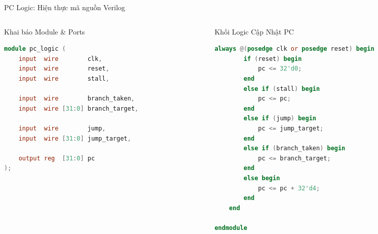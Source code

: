 \begin{frame}[fragile]{PC Logic: Hiện thực mã nguồn Verilog}
    \begin{columns}[t]
        \begin{column}{0.46\textwidth}
            \begin{block}{Khai báo Module \& Ports}
                \begin{lstlisting}[language=Verilog, basicstyle=\fontsize{6.5pt}{8.0pt}\selectfont\ttfamily, keywordstyle=\color{blue}, commentstyle=\color{gray}]
module pc_logic (
    input  wire        clk,
    input  wire        reset,
    input  wire        stall,

    input  wire        branch_taken,
    input  wire [31:0] branch_target,

    input  wire        jump,
    input  wire [31:0] jump_target,

    output reg  [31:0] pc
);
                \end{lstlisting}
            \end{block}
        \end{column}
        
        \begin{column}{0.50\textwidth}
            \begin{block}{Khối Logic Cập Nhật PC}
                \begin{lstlisting}[language=Verilog, basicstyle=\fontsize{6.5pt}{8.0pt}\selectfont\ttfamily, keywordstyle=\color{blue}, commentstyle=\color{gray}]
    always @(posedge clk or posedge reset) begin
        if (reset) begin
            pc <= 32'd0;
        end
        else if (stall) begin
            pc <= pc;
        end
        else if (jump) begin
            pc <= jump_target;
        end
        else if (branch_taken) begin
            pc <= branch_target;
        end
        else begin
            pc <= pc + 32'd4;
        end
    end

endmodule
                \end{lstlisting}
            \end{block}
        \end{column}
    \end{columns}
\end{frame}

